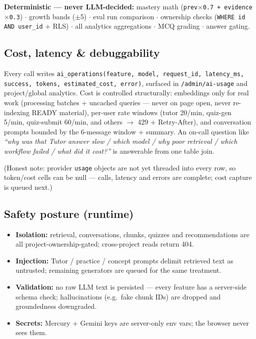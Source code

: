 \documentclass[11pt,a4paper]{article}
\begin{document}
\begin{shaded}
\noindent\textbf{Deterministic --- never LLM-decided:}
mastery math (\texttt{prev$\times$0.7 + evidence$\times$0.3}) $\cdot$ growth bands ($\pm$5)
$\cdot$ eval run comparison $\cdot$ ownership checks (\texttt{WHERE id AND user\_id} + RLS)
$\cdot$ all analytics aggregations $\cdot$ MCQ grading $\cdot$ answer gating.
\end{shaded}

\subsection{Cost, latency \& debuggability}

Every call writes \texttt{ai\_operations(feature, model, request\_id, latency\_ms, success, tokens, estimated\_cost, error)}, surfaced in \texttt{/admin/ai-usage} and project/global analytics. Cost is controlled structurally: embeddings only for real work (processing batches + uncached queries --- never on page open, never re-indexing READY material), per-user rate windows (tutor 20/min, quiz-gen 5/min, quiz-submit 60/min, and others $\rightarrow$ 429 + Retry-After), and conversation prompts bounded by the 6-message window + summary. An on-call question like \textit{``why was that Tutor answer slow / which model / why poor retrieval / which workflow failed / what did it cost?''} is answerable from one table join.

(Honest note: provider \texttt{usage} objects are not yet threaded into every row, so token/cost cells can be null --- calls, latency and errors are complete; cost capture is queued next.)

\subsection{Safety posture (runtime)}

\begin{itemize}
\item \textbf{Isolation:} retrieval, conversations, chunks, quizzes and recommendations are all project-ownership-gated; cross-project reads return 404.
\item \textbf{Injection:} Tutor / practice / concept prompts delimit retrieved text as untrusted; remaining generators are queued for the same treatment.
\item \textbf{Validation:} no raw LLM text is persisted --- every feature has a server-side schema check; hallucinations (e.g.\ fake chunk IDs) are dropped and groundedness downgraded.
\item \textbf{Secrets:} Mercury + Gemini keys are server-only env vars; the browser never sees them.
\end{itemize}
\end{document}
